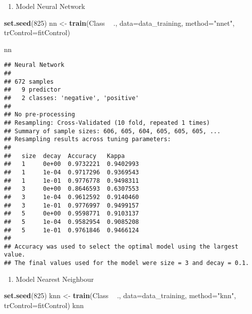 \documentclass[]{article}
\newenvironment{Shaded}{\begin{snugshade}}{\end{snugshade}}
\newcommand{\DataTypeTok}[1]{\textcolor[rgb]{0.13,0.29,0.53}{#1}}
\newcommand{\DecValTok}[1]{\textcolor[rgb]{0.00,0.00,0.81}{#1}}
\newcommand{\KeywordTok}[1]{\textcolor[rgb]{0.13,0.29,0.53}{\textbf{#1}}}
\newcommand{\NormalTok}[1]{#1}
\newcommand{\OperatorTok}[1]{\textcolor[rgb]{0.81,0.36,0.00}{\textbf{#1}}}
\newcommand{\StringTok}[1]{\textcolor[rgb]{0.31,0.60,0.02}{#1}}
\providecommand{\tightlist}{%
  \setlength{\itemsep}{0pt}\setlength{\parskip}{0pt}}
\begin{document}
\begin{enumerate}
\def\labelenumi{\arabic{enumi}.}
\setcounter{enumi}{2}
\tightlist
\item
  Model Neural Network
\end{enumerate}

\begin{Shaded}
\begin{Highlighting}[]
\KeywordTok{set.seed}\NormalTok{(}\DecValTok{825}\NormalTok{)}
\NormalTok{nn <-}\StringTok{ }\KeywordTok{train}\NormalTok{(Class }\OperatorTok{~}\StringTok{ }\NormalTok{., }
            \DataTypeTok{data=}\NormalTok{data_training, }
            \DataTypeTok{method=}\StringTok{"nnet"}\NormalTok{,}
            \DataTypeTok{trControl=}\NormalTok{fitControl)}
\end{Highlighting}
\end{Shaded}

\begin{Shaded}
\begin{Highlighting}[]
\NormalTok{nn}
\end{Highlighting}
\end{Shaded}

\begin{verbatim}
## Neural Network 
## 
## 672 samples
##   9 predictor
##   2 classes: 'negative', 'positive' 
## 
## No pre-processing
## Resampling: Cross-Validated (10 fold, repeated 1 times) 
## Summary of sample sizes: 606, 605, 604, 605, 605, 605, ... 
## Resampling results across tuning parameters:
## 
##   size  decay  Accuracy   Kappa    
##   1     0e+00  0.9732221  0.9402993
##   1     1e-04  0.9717296  0.9369543
##   1     1e-01  0.9776778  0.9498311
##   3     0e+00  0.8646593  0.6307553
##   3     1e-04  0.9612592  0.9140460
##   3     1e-01  0.9776997  0.9499157
##   5     0e+00  0.9598771  0.9103137
##   5     1e-04  0.9582954  0.9085208
##   5     1e-01  0.9761846  0.9466124
## 
## Accuracy was used to select the optimal model using the largest value.
## The final values used for the model were size = 3 and decay = 0.1.
\end{verbatim}

\begin{enumerate}
\def\labelenumi{\arabic{enumi}.}
\setcounter{enumi}{3}
\tightlist
\item
  Model Nearest Neighbour
\end{enumerate}

\begin{Shaded}
\begin{Highlighting}[]
\KeywordTok{set.seed}\NormalTok{(}\DecValTok{825}\NormalTok{)}
\NormalTok{knn <-}\StringTok{ }\KeywordTok{train}\NormalTok{(Class }\OperatorTok{~}\StringTok{ }\NormalTok{., }
             \DataTypeTok{data=}\NormalTok{data_training, }
             \DataTypeTok{method=}\StringTok{"knn"}\NormalTok{,}
             \DataTypeTok{trControl=}\NormalTok{fitControl)}
\NormalTok{knn}
\end{Highlighting}
\end{Shaded}
\end{document}
